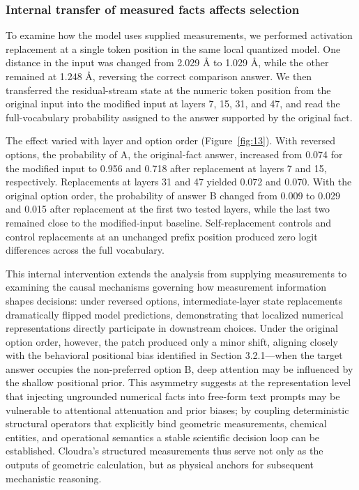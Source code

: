 \subsubsection{Internal transfer of measured facts affects selection}

To examine how the model uses supplied measurements, we performed activation replacement at a single token position in the same local quantized model.\citep{ref16} One distance in the input was changed from 2.029 Å to 1.029 Å, while the other remained at 1.248 Å, reversing the correct comparison answer. We then transferred the residual-stream state at the numeric token position from the original input into the modified input at layers 7, 15, 31, and 47, and read the full-vocabulary probability assigned to the answer supported by the original fact.

The effect varied with layer and option order (Figure~\ref{fig:13}). With reversed options, the probability of A, the original-fact answer, increased from 0.074 for the modified input to 0.956 and 0.718 after replacement at layers 7 and 15, respectively. Replacements at layers 31 and 47 yielded 0.072 and 0.070. With the original option order, the probability of answer B changed from 0.009 to 0.029 and 0.015 after replacement at the first two tested layers, while the last two remained close to the modified-input baseline. Self-replacement controls and control replacements at an unchanged prefix position produced zero logit differences across the full vocabulary.

This internal intervention extends the analysis from supplying measurements to examining the causal mechanisms governing how measurement information shapes decisions: under reversed options, intermediate-layer state replacements dramatically flipped model predictions, demonstrating that localized numerical representations directly participate in downstream choices. Under the original option order, however, the patch produced only a minor shift, aligning closely with the behavioral positional bias identified in Section 3.2.1—when the target answer occupies the non-preferred option B, deep attention may be influenced by the shallow positional prior. This asymmetry suggests at the representation level that injecting ungrounded numerical facts into free-form text prompts may be vulnerable to attentional attenuation and prior biases; by coupling deterministic structural operators that explicitly bind geometric measurements, chemical entities, and operational semantics a stable scientific decision loop can be established. Cloudra's structured measurements thus serve not only as the outputs of geometric calculation, but as physical anchors for subsequent mechanistic reasoning.


